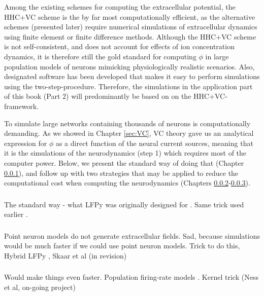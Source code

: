 Among the existing schemes for computing the extracellular potential, the HHC+VC scheme is the by far most computationally efficient, as the alternative schemes (presented later) require numerical simulations of extracellular dynamics using finite element or finite difference methods. Although the HHC+VC scheme is not self-consistent, and does not account for effects of ion concentration dynamics, it is therefore still the gold standard for computing $\phi$ in large population models of neurons mimicking physiologically realistic scenarios. Also, designated software has been developed that makes it easy to perform simulations using the two-step-procedure. Therefore, the simulations in the application part of this book (Part 2) will predominantly be based on on the HHC+VC-framework.

To simulate large networks containing thousands of neurons is computationally demanding. As we showed in Chapter \ref{sec:VC}, VC theory gave us an analytical expression for $\phi$ as a direct function of the neural current sources, meaning that it is the simulations of the neurodynamics (step 1) which requires most of the computer power. Below, we present the standard way of doing that (Chapter \ref{sec:Schemes:LFPy}), and follow up with two strategies that may be applied to reduce the computational cost when computing the neurodynamics (Chapters \ref{sec:Schemes:HybridLFPy}-\ref{sec:Schemes:KernelLFPy}).


\subsubsection{}
\label{sec:Schemes:LFPy}
The standard way - what LFPy was originally designed for \cite{Hagen2018}.
Same trick used earlier \citep{Holt1999}.


\subsubsection{}
\label{sec:Schemes:HybridLFPy}

Point neuron models do not generate extracellular fields. Sad, because simulations would be much faster if we could use point 
neuron models. Trick to do this, Hybrid LFPy \citep{Hagen2016}, Skaar et al (in revision)



\subsubsection{}
\label{sec:Schemes:KernelLFPy}
Would make things even faster. Population firing-rate models  \citep{Hagen2016}. Kernel trick (Ness et al, on-going project) 

